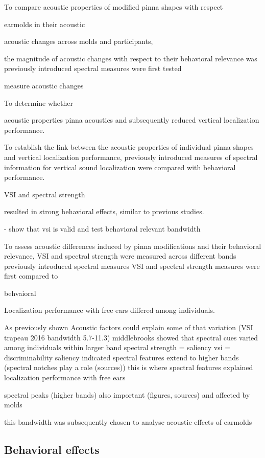 To compare acoustic properties of modified pinna shapes with respect 

earmolds in their acoustic 

acoustic changes across molds and participants, 

the magnitude of acoustic changes with respect to their behavioral relevance was previously introduced spectral measures were first tested 

measure acoustic changes 

To determine whether 

acoustic properties  pinna acoustics and subsequently reduced vertical localization performance.


To establish the link between the acoustic properties of individual pinna shapes and vertical localization performance, previously introduced measures of spectral information for vertical sound localization were compared with behavioral performance. 

VSI and spectral strength 


resulted in strong behavioral effects, similar to previous studies. 

- show that vsi is valid and test behavioral relevant bandwidth

To assess acoustic differences induced by pinna modifications and their behavioral relevance, VSI and spectral strength were measured across different bands previously introduced spectral measures VSI and spectral strength measures were first compared to 

behvaioral 

Localization performance with free ears differed among individuals. 

As previously shown Acoustic factors could explain some of that variation (VSI trapeau 2016 bandwidth 5.7-11.3) 
middlebrooks showed that spectral cues varied among individuals within larger band 
spectral strength = saliency
vsi = discriminability
saliency indicated spectral features extend to higher bands (spectral notches play a role (sources))
this is where spectral features explained localization performance with free ears

spectral peaks (higher bands) also important (figures, sources) and affected by molds

this bandwidth was subsequently chosen to analyse acoustic effects of earmolds






\subsection{Behavioral effects}


